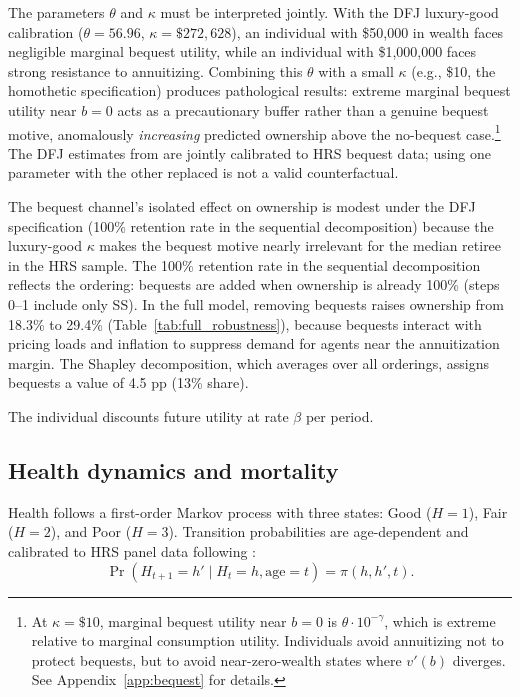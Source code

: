 \documentclass[12pt]{article}
\begin{document}
The parameters $\theta$ and $\kappa$ must be interpreted jointly. With the DFJ luxury-good calibration ($\theta = 56.96$, $\kappa = \$272{,}628$), an individual with \$50,000 in wealth faces negligible marginal bequest utility, while an individual with \$1,000,000 faces strong resistance to annuitizing. Combining this $\theta$ with a small $\kappa$ (e.g., \$10, the homothetic specification) produces pathological results: extreme marginal bequest utility near $b = 0$ acts as a precautionary buffer rather than a genuine bequest motive, anomalously \emph{increasing} predicted ownership above the no-bequest case.\footnote{At $\kappa = \$10$, marginal bequest utility near $b = 0$ is $\theta \cdot 10^{-\gamma}$, which is extreme relative to marginal consumption utility. Individuals avoid annuitizing not to protect bequests, but to avoid near-zero-wealth states where $v'(b)$ diverges. See Appendix~\ref{app:bequest} for details.} The DFJ estimates from \citet{lockwood2012} are jointly calibrated to HRS bequest data; using one parameter with the other replaced is not a valid counterfactual.

The bequest channel's isolated effect on ownership is modest under the DFJ specification (100\% retention rate in the sequential decomposition) because the luxury-good $\kappa$ makes the bequest motive nearly irrelevant for the median retiree in the HRS sample. The 100\% retention rate in the sequential decomposition reflects the ordering: bequests are added when ownership is already 100\% (steps 0--1 include only SS). In the full model, removing bequests raises ownership from 18.3\% to 29.4\% (Table~\ref{tab:full_robustness}), because bequests interact with pricing loads and inflation to suppress demand for agents near the annuitization margin. The Shapley decomposition, which averages over all orderings, assigns bequests a value of 4.5 pp (13\% share).

The individual discounts future utility at rate $\beta$ per period.

\subsection{Health dynamics and mortality}

Health follows a first-order Markov process with three states: Good ($H = 1$), Fair ($H = 2$), and Poor ($H = 3$). Transition probabilities are age-dependent and calibrated to HRS panel data following \citet{denardi2010}:
\begin{equation}
\Pr(H_{t+1} = h' \mid H_t = h, \text{age} = t) = \pi(h, h', t).
\end{equation}
\end{document}
